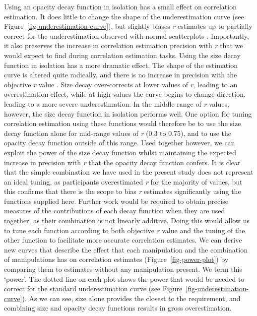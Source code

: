 \documentclass[manuscript, review, anonymous, screen]{acmart}
\begin{document}
Using an opacity decay function in isolation has a small effect on
correlation estimation. It does little to change the shape of the
underestimation curve (see Figure~\ref{fig-underestimation-curve}), but
slightly biases \emph{r} estimates up to partially correct for the
underestimation observed with normal scatterplots \citep{strain_2023}.
Importantly, it also preserves the increase in correlation estimation
precision with \emph{r} that we would expect to find during correlation
estimation tasks. Using the size decay function in isolation has a more
dramatic effect. The shape of the estimation curve is altered quite
radically, and there is no increase in precision with the objective
\emph{r} value \citep{strain_2023b}. Size decay over-corrects at lower
values of \emph{r}, leading to an overestimation effect, while at high
values the curve begins to change direction, leading to a more severe
underestimation. In the middle range of \emph{r} values, however, the
size decay function in isolation performs well. One option for tuning
correlation estimation using these functions would therefore be to use
the size decay function alone for mid-range values of \emph{r} (0.3 to
0.75), and to use the opacity decay function outside of this range. Used
together however, we can exploit the power of the size decay function
whilst maintaining the expected increase in precision with \emph{r} that
the opacity decay function confers. It is clear that the simple
combination we have used in the present study does not represent an
ideal tuning, as participants overestimated \emph{r} for the majority of
values, but this confirms that there is the scope to bias \emph{r}
estimates significantly using the functions supplied here. Further work
would be required to obtain precise measures of the contributions of
each decay function when they are used together, as their combination is
not linearly additive. Doing this would allow us to tune each function
according to both objective \emph{r} value and the tuning of the other
function to facilitate more accurate correlation estimates. We can
derive new curves that describe the effect that each manipulation and
the combination of manipulations has on correlation estimates
(Figure~\ref{fig-power-plot}) by comparing them to estimates without any
manipulation present. We term this `power'. The dotted line on each plot
shows the power that would be needed to correct for the standard
underestimation curve (see Figure~\ref{fig-underestimation-curve}). As
we can see, size alone provides the closest to the requirement, and
combining size and opacity decay functions results in gross
overestimation.
\end{document}
